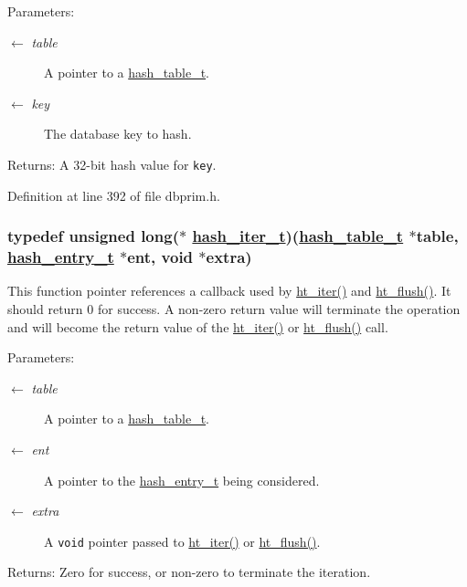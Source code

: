 \begin{Desc}
\item[Parameters:]
\begin{description}
\item[\mbox{$\leftarrow$} {\em table}]A pointer to a \hyperlink{group__dbprim__hash_ga1}{hash\_\-table\_\-t}. \item[\mbox{$\leftarrow$} {\em key}]The database key to hash.\end{description}
\end{Desc}
\begin{Desc}
\item[Returns:]A 32-bit hash value for {\tt key}.\end{Desc}


Definition at line 392 of file dbprim.h.\hypertarget{group__dbprim__hash_ga3}{
\subsubsection[hash\_\-iter\_\-t]{\setlength{\rightskip}{0pt plus 5cm}typedef unsigned long($\ast$ \hyperlink{group__dbprim__hash_ga3}{hash\_\-iter\_\-t})(\hyperlink{struct__hash__table__s}{hash\_\-table\_\-t} $\ast$table, \hyperlink{struct__hash__entry__s}{hash\_\-entry\_\-t} $\ast$ent, void $\ast$extra)}}
\label{group__dbprim__hash_ga3}


This function pointer references a callback used by \hyperlink{group__dbprim__hash_ga14}{ht\_\-iter()} and \hyperlink{group__dbprim__hash_ga15}{ht\_\-flush()}. It should return 0 for success. A non-zero return value will terminate the operation and will become the return value of the \hyperlink{group__dbprim__hash_ga14}{ht\_\-iter()} or \hyperlink{group__dbprim__hash_ga15}{ht\_\-flush()} call.

\begin{Desc}
\item[Parameters:]
\begin{description}
\item[\mbox{$\leftarrow$} {\em table}]A pointer to a \hyperlink{group__dbprim__hash_ga1}{hash\_\-table\_\-t}. \item[\mbox{$\leftarrow$} {\em ent}]A pointer to the \hyperlink{group__dbprim__hash_ga2}{hash\_\-entry\_\-t} being considered. \item[\mbox{$\leftarrow$} {\em extra}]A {\tt void} pointer passed to \hyperlink{group__dbprim__hash_ga14}{ht\_\-iter()} or \hyperlink{group__dbprim__hash_ga15}{ht\_\-flush()}.\end{description}
\end{Desc}
\begin{Desc}
\item[Returns:]Zero for success, or non-zero to terminate the iteration.\end{Desc}


